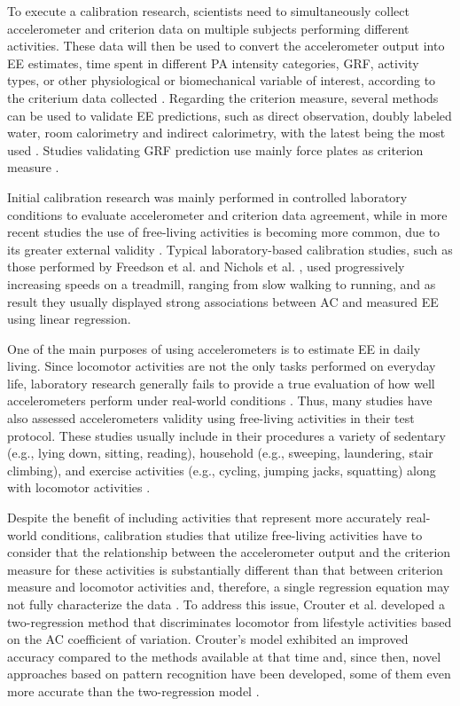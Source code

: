 \documentclass[12pt]{article}
\begin{document}
To execute a calibration research, scientists need to simultaneously collect accelerometer and criterion data on multiple subjects performing different activities. These data will then be used to convert the accelerometer output into EE estimates, time spent in different PA intensity categories, GRF, activity types, or other physiological or biomechanical variable of interest, according to the criterium data collected . Regarding the criterion measure, several methods can be used to validate EE predictions, such as direct observation, doubly labeled water, room calorimetry and indirect calorimetry, with the latest being the most used . Studies validating GRF prediction use mainly force plates as criterion measure .

Initial calibration research was mainly performed in controlled laboratory conditions to evaluate accelerometer and criterion data agreement, while in more recent studies the use of free-living activities is becoming more common, due to its greater external validity . Typical laboratory-based calibration studies, such as those performed by Freedson et al.  and Nichols et al. , used progressively increasing speeds on a treadmill, ranging from slow walking to running, and as result they usually displayed strong associations between AC and measured EE using linear regression.

One of the main purposes of using accelerometers is to estimate EE in daily living. Since locomotor activities are not the only tasks performed on everyday life, laboratory research generally fails to provide a true evaluation of how well accelerometers perform under real-world conditions . Thus, many studies have also assessed accelerometers validity using free-living activities in their test protocol. These studies usually include in their procedures a variety of sedentary (e.g., lying down, sitting, reading), household (e.g., sweeping, laundering, stair climbing), and exercise activities (e.g., cycling, jumping jacks, squatting) along with locomotor activities .

Despite the benefit of including activities that represent more accurately real-world conditions, calibration studies that utilize free-living activities have to consider that the relationship between the accelerometer output and the criterion measure for these activities is substantially different than that between criterion measure and locomotor activities and, therefore, a single regression equation may not fully characterize the data . To address this issue, Crouter et al.  developed a two-regression method that discriminates locomotor from lifestyle activities based on the AC coefficient of variation. Crouter's model exhibited an improved accuracy compared to the methods available at that time and, since then, novel approaches based on pattern recognition have been developed, some of them even more accurate than the two-regression model .
\end{document}
